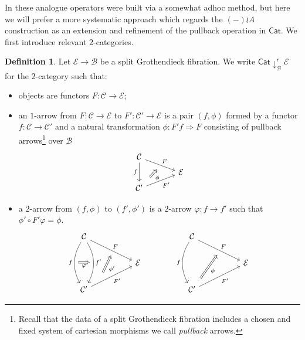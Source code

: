 \documentclass[a4paper,10pt
,draft
]{article}%
\numberwithin{equation}{section}
\numberwithin{figure}{section}
\theoremstyle{definition} %
\newtheorem{definition}[equation]{Definition}%
\newcommand{\Cat}{\mathsf{Cat}}
\newcommand{\1}{\ensuremath{\mathbbm 1}}%
\begin{document}
In \cite{BP_geo} these analogue operators were built via a somewhat adhoc method, but here we will prefer a more systematic approach which regards the $(-) \wr A$ construction as an extension and refinement of the pullback operation in $\Cat$.
We first introduce relevant $2$-categories.


\begin{definition}
Let $\mathcal{E} \to \mathcal{B}$ be a split Grothendieck fibration.
We write $\mathsf{Cat}\downarrow^r_{\mathcal{B}} \mathcal{E}$ for the $2$-category such that:
\begin{itemize}
	\item objects are functors $F \colon \mathcal{C} \to \mathcal{E}$; 
	
	\item an $1$-arrow from 
	$F \colon \mathcal{C} \to \mathcal{E}$
	to
	$F' \colon \mathcal{C}' \to \mathcal{E}$
	is a pair $(f,\phi)$
	formed by a functor $f\colon \mathcal{C} \to \mathcal{C}'$ and a natural transformation $\phi \colon F' f \Rightarrow F$ consisting of pullback arrows\footnote{Recall that the data of a split Grothendieck fibration includes a chosen and fixed system of cartesian morphisms we call \textit{pullback} arrows.} over $\mathcal{B}$
		\begin{equation}
		\begin{tikzcd}[row sep = tiny, column sep = 35pt]
			\mathcal{C} \arrow{dr}[name=U]{F} \arrow{dd}[swap]{f}
		\\
			& \mathcal{E}
		\\
			|[alias=V]| \mathcal{C}' \arrow{ur}[swap]{F'}
		\arrow[Rightarrow, from=V, to=U,shorten >=0.25cm,shorten <=0.25cm
		,swap,"\phi"
		]
		\end{tikzcd}
		\end{equation}
	\item a $2$-arrow from $(f,\phi)$ to $(f',\phi')$ is a $2$-arrow $\varphi \colon f \to f'$ such that
	$\phi' \circ F' \varphi = \phi$.
		\begin{equation}
		\begin{tikzcd}[column sep = 50pt]
			\mathcal{C} \arrow{dr}[name=U]{F} 
			\arrow[bend right]{dd}[swap]{f}[name=F]{}
			\arrow[bend left]{dd}{f'}[swap,name=FF]{}
			&
		&
			\mathcal{C} \arrow{dr}[name=U2]{F} 
			\arrow[bend right]{dd}[swap]{f}
			&
		\\
			& \mathcal{E}
		&
			& \mathcal{E}
		\\
			\mathcal{C}' \arrow{ur}[swap]{F'}[near start, name=V]{}
			&
		&
			|[alias=V2]| \mathcal{C}' \arrow{ur}[swap]{F'}
			&
		\arrow[Rightarrow, from=V, to=U,shorten >=0.25cm,shorten <=0.25cm
		,swap,"\phi'"
		]
		\arrow[Rightarrow, from=F, to=FF,shorten >=0.0cm,shorten <=0.0cm
		,swap,"\varphi"
		]
		\arrow[Rightarrow, from=V2, to=U2,shorten >=0.25cm,shorten <=0.25cm
		,swap,"\phi"
		]
		\end{tikzcd}
		\end{equation}
\end{itemize}
\end{definition}
\end{document}
